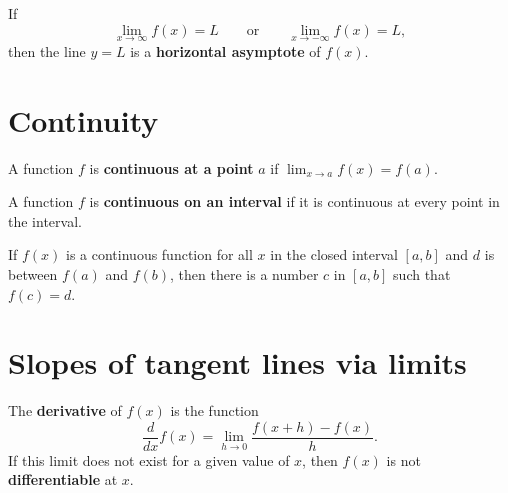 \documentclass{ximera}
\newcommand{\ddx}{\frac{d}{dx}}
\begin{document}
\begin{definition}
If
\[
\lim_{x\to \infty} f(x) = L \qquad\text{or}\qquad \lim_{x\to -\infty} f(x) = L,
\]
then the line $y=L$ is a \textbf{horizontal asymptote} of $f(x)$.
\end{definition}







\section*{Continuity}






\begin{definition}
A function $f$ is \textbf{continuous at a point} $a$ if $\lim_{x\to a}
f(x) = f(a)$.
\end{definition}




\begin{definition}
A function $f$ is \textbf{continuous on an interval} if it is
continuous at every point in the interval.
\end{definition}




\begin{theorem}
If $f(x)$ is a continuous function for all $x$ in the closed interval
$[a,b]$ and $d$ is between $f(a)$ and $f(b)$, then there is a number
$c$ in $[a, b]$ such that $f(c) = d$.
\end{theorem}







\section*{Slopes of tangent lines via limits}







\begin{definition}
The \textbf{derivative} of $f(x)$ is the function
\[
\ddx f(x) = \lim_{h\to 0} \frac{f(x+h) - f(x)}{h}.
\]
If this limit does not exist for a given value of $x$, then $f(x)$ is
not \textbf{differentiable} at $x$.
\end{definition}
\end{document}
